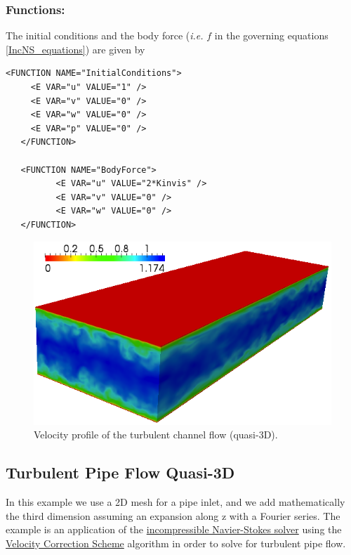 \subsubsection{Functions:~} The initial conditions and the body force (\textit{i.e.} $f$ in the governing equations \ref{IncNS_equations}) are given by
\begin{lstlisting}[style=XMLStyle]
   <FUNCTION NAME="InitialConditions">
     <E VAR="u" VALUE="1" />
     <E VAR="v" VALUE="0" />
     <E VAR="w" VALUE="0" />
     <E VAR="p" VALUE="0" />
   </FUNCTION>
   
   <FUNCTION NAME="BodyForce">
          <E VAR="u" VALUE="2*Kinvis" />
          <E VAR="v" VALUE="0" />
          <E VAR="w" VALUE="0" />
   </FUNCTION>
\end{lstlisting}


\begin{figure}
\begin{center}
\includegraphics[width=12cm]{Figures/ChanCont.png}
\caption{Velocity profile of the turbulent channel flow (quasi-3D).}
\end{center}
\end{figure}


\subsection{Turbulent Pipe Flow Quasi-3D}
In this example we use a 2D mesh for a pipe inlet, and we add mathematically the third dimension assuming an expansion along z with a Fourier series. The example is an application of the \hyperref[IncNSsolver]{incompressible Navier-Stokes solver} using the \hyperref[VCSscheme]{Velocity Correction Scheme} algorithm in order to solve for turbulent pipe flow.

